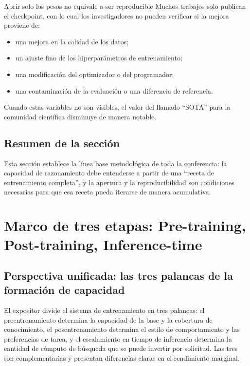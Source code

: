 \documentclass[a4paper]{article}
\begin{document}
\begin{warningbox}{Abrir solo los pesos no equivale a ser reproducible}
Muchos trabajos solo publican el checkpoint, con lo cual los investigadores no pueden verificar si la mejora proviene de:
\begin{itemize}
    \item una mejora en la calidad de los datos;
    \item un ajuste fino de los hiperparámetros de entrenamiento;
    \item una modificación del optimizador o del programador;
    \item una contaminación de la evaluación o una diferencia de referencia.
\end{itemize}
Cuando estas variables no son visibles, el valor del llamado ``SOTA'' para la comunidad científica disminuye de manera notable.
\end{warningbox}

\subsection{Resumen de la sección}
Esta sección establece la línea base metodológica de toda la conferencia: la capacidad de razonamiento debe entenderse a partir de una ``receta de entrenamiento completa'', y la apertura y la reproducibilidad son condiciones necesarias para que esa receta pueda iterarse de manera acumulativa.

\section{Marco de tres etapas: Pre-training, Post-training, Inference-time}

\subsection{Perspectiva unificada: las tres palancas de la formación de capacidad}
El expositor divide el sistema de entrenamiento en tres palancas: el preentrenamiento determina la capacidad de la base y la cobertura de conocimiento, el posentrenamiento determina el estilo de comportamiento y las preferencias de tarea, y el escalamiento en tiempo de inferencia determina la cantidad de cómputo de búsqueda que se puede invertir por solicitud. Las tres son complementarias y presentan diferencias claras en el rendimiento marginal.
\end{document}
